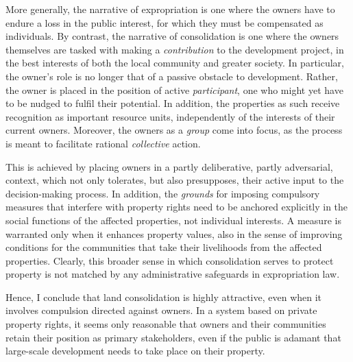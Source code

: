 More generally, the narrative of expropriation is one where the owners have to endure a loss in the public interest, for which they must be compensated as individuals. By contrast, the narrative of consolidation is one where the owners themselves are tasked with making a {\it contribution} to the development project, in the best interests of both the local community and greater society. In particular, the owner's role is no longer that of a passive obstacle to development. Rather, the owner is placed in the position of active {\it participant}, one who might yet have to be nudged to fulfil their potential. In addition, the properties as such receive recognition as important resource units, independently of the interests of their current owners. Moreover, the owners as a {\it group} come into focus, as the process is meant to facilitate rational {\it collective} action.

This is achieved by placing owners in a partly deliberative, partly adversarial, context, which not only tolerates, but also presupposes, their active input to the decision-making process. In addition, the {\it grounds} for imposing compulsory measures that interfere with property rights need to be anchored explicitly in the social functions of the affected properties, not individual interests. A measure is warranted only when it enhances property values, also in the sense of improving conditions for the communities that take their livelihoods from the affected properties. Clearly, this broader sense in which consolidation serves to protect property is not matched by any administrative safeguards in expropriation law.

Hence, I conclude that land consolidation is highly attractive, even when it involves compulsion directed against owners. In a system based on private property rights, it seems only reasonable that owners and their communities retain their position as primary stakeholders, even if the public is adamant that large-scale development needs to take place on their property.

 
